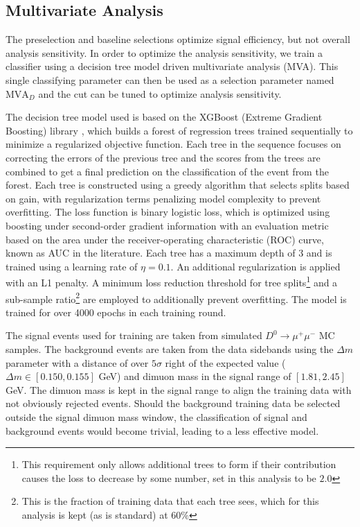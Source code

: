 

\subsection{Multivariate Analysis}
\label{subsec:mva}

The preselection and baseline selections optimize signal efficiency, but not overall analysis sensitivity. In order to optimize the analysis sensitivity, we train a classifier using a decision tree model driven multivariate analysis (MVA). This single classifying parameter can then be used as a selection parameter named $\text{MVA}_D$ and the cut can be tuned to optimize analysis sensitivity.

The decision tree model used is based on the XGBoost (Extreme Gradient Boosting) library \cite{ref:chen_Guestrin_2016}, which builds a forest of regression trees trained sequentially to minimize a regularized objective function. Each tree in the sequence focuses on correcting the errors of the previous tree and the scores from the trees are combined to get a final prediction on the classification of the event from the forest. Each tree is constructed using a greedy algorithm that selects splits based on gain, with regularization terms penalizing model complexity to prevent overfitting. The loss function is binary logistic loss, which is optimized using boosting under second-order gradient information with an evaluation metric based on the area under the receiver-operating characteristic (ROC) curve, known as AUC in the literature. Each tree has a maximum depth of 3 and is trained using a learning rate of $\eta = 0.1$. An additional regularization is applied with an L1 penalty. A minimum loss reduction threshold for tree splits\footnote{This requirement only allows additional trees to form if their contribution causes the loss to decrease by some number, set in this analysis to be $2.0$} and a sub-sample ratio\footnote{This is the fraction of training data that each tree sees, which for this analysis is kept (as is standard) at $60\%$} are employed to additionally prevent overfitting. The model is trained for over 4000 epochs in each training round.

The signal events used for training are taken from simulated $D^0 \to \mu^+ \mu^-$ MC samples. The background events are taken from the data sidebands using the $\Delta m$ parameter with a distance of over $5\sigma$ right of the expected value ($\Delta m \in [0.150, 0.155]$ GeV) and dimuon mass in the signal range of $[1.81, 2.45]$ GeV. The dimuon mass is kept in the signal range to align the training data with not obviously rejected events. Should the background training data be selected outside the signal dimuon mass window, the classification of signal and background events would become trivial, leading to a less effective model.

